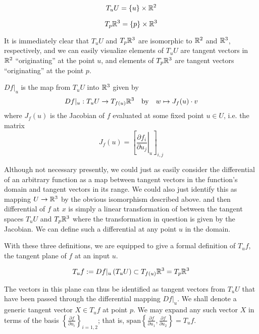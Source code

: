     
    \begin{defn} \label{def:tangent-at-U}
    	\[ T_{u} U = \left\{u\right\} \times \mathbb{R}^2
    	\]
    	\end{defn}
    \begin{defn}
    	\[ T_{p} \mathbb{R}^3 = \{p\} \times \mathbb{R}^3
    	\]
    \end{defn}
    It is immediately clear that $T_uU$ and $T_p\mathbb{R}^3$ are isomorphic to
    $\mathbb{R}^2$ and $\mathbb{R}^3$, respectively, and we can easily visualize elements of $T_uU$ are tangent vectors in $\mathbb{R}^2$ ``originating'' at the point $u$, and elements of $T_p\mathbb{R}^3$ are tangent vectors ``originating'' at the point $p$.
\begin{defn} \label{def:differential-map}
       	$Df\vert_u$ is the map from $T_uU$ into $\mathbb{R}^3$ given by
    \[
     Df|_u : T_uU \to T_{f(u)}\mathbb{R}^3
     \quad \textrm{by}
     \quad w \mapsto J_f (u) \cdot v
    \]
where $J_f(u)$ is the Jacobian of $f$ evaluated at some fixed point $u \in U$, i.e. the matrix
\[
J_f (u) = \left[ \left.\frac{\partial f_i}{\partial u_j}\right\vert_u \right]_{i,j}
\]
\end{defn} %
Although not necessary presently, we could just as easily consider the differential of an arbitrary function as a map between tangent vectors in the function's domain and tangent vectors in its range.
We could also just identify this as mapping  $U \to \mathbb{R}^3$ by the obvious isomorphism described above. and then differential of $f$ at $x$ is simply a linear transformation of between the tangent spaces $T_uU$ and $T_p\mathbb{R}^3$ where the transformation in question is given by the Jacobian. We can define such a differential at any point $u$ in the domain.

With these three definitions, we are equipped to give a formal definition of $T_uf$,
the tangent plane of $f$ at an input $u$.
\begin{defn}\label{def:tangent-plane}
\[
T_u f := Df\vert_u \left(T_u U\right)
\subset T_{f(u)} \mathbb{R}^3 = T_{p} \mathbb{R}^3
\]
\end{defn}

The vectors in this plane can thus be identified as tangent vectors from $T_uU$ that have been passed through the differential mapping $Df\vert_u$.
We shall denote a generic tangent vector $X \in T_u f$ at point $p$.
We may expand any such vector $X$ in terms of the basis $\left\{ \frac{\partial f}{\partial u_i}\right\}_{i=1,2}$; that is,
$\textrm{span}\left\{ \frac{\partial f}{\partial u_1}, \frac{\partial f}{\partial u_2}\right\} = T_u f$.

